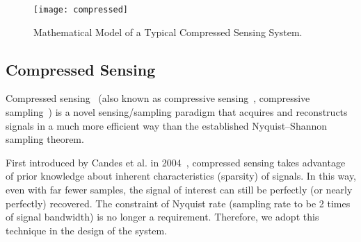 \begin{figure}[!h]
	\centering
	\texttt{[image: compressed]}
	\caption{Mathematical Model of a Typical Compressed Sensing System. 
	}
	\label{fig:compressed}
\end{figure}

\subsection{Compressed Sensing}\label{sec:compressed}

%


Compressed sensing~\cite{donoho2006compressed} (also known as compressive sensing~\cite{siddamal2015survey}, compressive sampling~\cite{candes2006compressive}) is a novel sensing/sampling paradigm that acquires and reconstructs signals in a much more efficient way than the established Nyquist–Shannon sampling theorem. 

%
%

First introduced by Candes et al. in 2004~\cite{candes2004robust}, compressed sensing takes advantage of prior knowledge about inherent characteristics (sparsity) of signals.
In this way, even with far fewer samples, the signal of interest can still be perfectly (or nearly perfectly) recovered. The constraint of Nyquist rate (sampling rate to be 2 times of signal bandwidth) is no longer a requirement. Therefore, we adopt this technique in the design of the  {\systemName} system.


